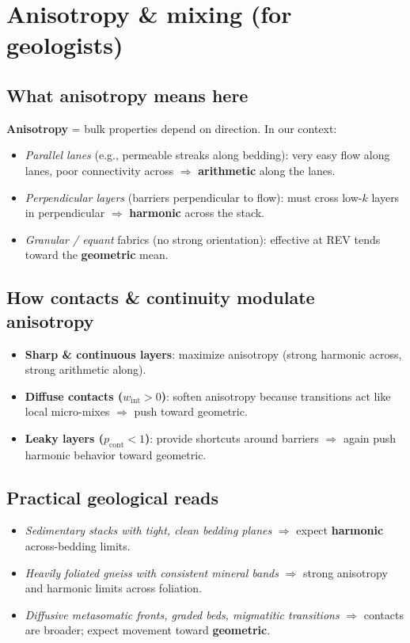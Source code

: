 \documentclass[11pt,a4paper]{article}
\begin{document}
\section{Anisotropy \& mixing (for geologists)}
\subsection*{What anisotropy means here}
\textbf{Anisotropy} = bulk properties depend on direction. In our context:
\begin{itemize}[leftmargin=*]
\item \emph{Parallel lanes} (e.g., permeable streaks along bedding): very easy flow along lanes, poor connectivity across $\Rightarrow$ \textbf{arithmetic} along the lanes.
\item \emph{Perpendicular layers} (barriers perpendicular to flow): must cross low-$k$ layers in perpendicular $\Rightarrow$ \textbf{harmonic} across the stack.
\item \emph{Granular / equant} fabrics (no strong orientation): effective at REV tends toward the \textbf{geometric} mean.
\end{itemize}

\subsection*{How contacts \& continuity modulate anisotropy}
\begin{itemize}[leftmargin=*]
\item \textbf{Sharp \& continuous layers}: maximize anisotropy (strong harmonic across, strong arithmetic along).
\item \textbf{Diffuse contacts ($w_{\text{int}}>0$)}: soften anisotropy because transitions act like local micro-mixes $\Rightarrow$ push toward geometric.
\item \textbf{Leaky layers ($p_{\text{cont}}<1$)}: provide shortcuts around barriers $\Rightarrow$ again push harmonic behavior toward geometric.
\end{itemize}

\subsection*{Practical geological reads}
\begin{itemize}[leftmargin=*]
\item \emph{Sedimentary stacks with tight, clean bedding planes} $\Rightarrow$ expect \textbf{harmonic} across-bedding limits.
\item \emph{Heavily foliated gneiss with consistent mineral bands} $\Rightarrow$ strong anisotropy and harmonic limits across foliation.
\item \emph{Diffusive metasomatic fronts, graded beds, migmatitic transitions} $\Rightarrow$ contacts are broader; expect movement toward \textbf{geometric}.
\end{itemize}
\end{document}
